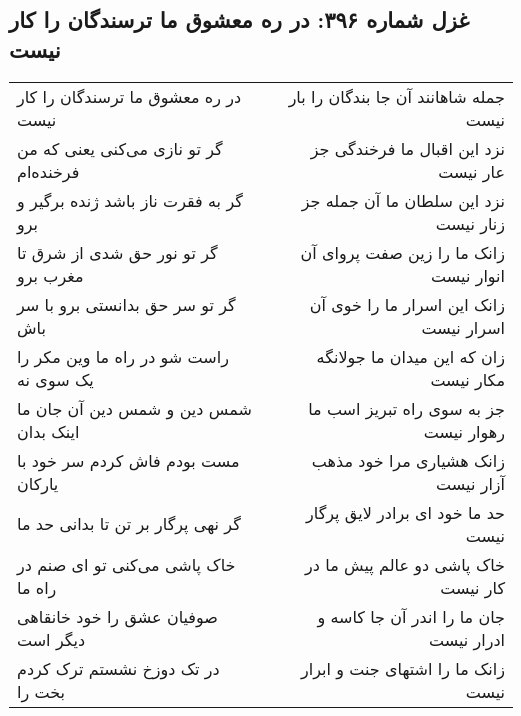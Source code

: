 \begin{center}
\section*{غزل شماره ۳۹۶: در ره معشوق ما ترسندگان را کار نیست}
\label{sec:0396}
\begin{longtable}{l p{0.5cm} r}
در ره معشوق ما ترسندگان را کار نیست
&&
جمله شاهانند آن جا بندگان را بار نیست
\\
گر تو نازی می‌کنی یعنی که من فرخنده‌ام
&&
نزد این اقبال ما فرخندگی جز عار نیست
\\
گر به فقرت ناز باشد ژنده برگیر و برو
&&
نزد این سلطان ما آن جمله جز زنار نیست
\\
گر تو نور حق شدی از شرق تا مغرب برو
&&
زانک ما را زین صفت پروای آن انوار نیست
\\
گر تو سر حق بدانستی برو با سر باش
&&
زانک این اسرار ما را خوی آن اسرار نیست
\\
راست شو در راه ما وین مکر را یک سوی نه
&&
زان که این میدان ما جولانگه مکار نیست
\\
شمس دین و شمس دین آن جان ما اینک بدان
&&
جز به سوی راه تبریز اسب ما رهوار نیست
\\
مست بودم فاش کردم سر خود با یارکان
&&
زانک هشیاری مرا خود مذهب آزار نیست
\\
گر نهی پرگار بر تن تا بدانی حد ما
&&
حد ما خود ای برادر لایق پرگار نیست
\\
خاک پاشی می‌کنی تو ای صنم در راه ما
&&
خاک پاشی دو عالم پیش ما در کار نیست
\\
صوفیان عشق را خود خانقاهی دیگر است
&&
جان ما را اندر آن جا کاسه و ادرار نیست
\\
در تک دوزخ نشستم ترک کردم بخت را
&&
زانک ما را اشتهای جنت و ابرار نیست
\\
\end{longtable}
\end{center}
